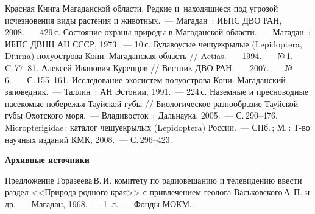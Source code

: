 \begin{thebibliography}{99}

\bibitem{} Красная Книга Магаданской области. Редкие и~находящиеся под угрозой исчезновения виды растения и животных.~--- Магадан~: ИБПС ДВО РАН, 2008.~--- 429\,с.
\bibitem{} Состояние охраны природы в Магаданской области.~--- Магадан~: ИБПС ДВНЦ АН СССР, 1973.~--- 10\,с.
\bibitem{} Булавоусые чешуекрылые (Lepidoptera, Diurna) полуострова Кони. Магаданская область // Actias.~--- 1994.~--- №\,1.~--- C.\,77--81.
\bibitem{} Алексей Иванович Куренцов // Вестник ДВО РАН.~--- 2007.~--- №\,6.~--- С.\,155--161.
\bibitem{} Исследование экосистем полуострова Кони. Магаданский заповедник.~--- Таллин~: АН Эстонии, 1991.~--- 224\,с.
\bibitem{} Наземные и пресноводные насекомые побережья Тауйской губы // Биологическое разнообразие Тауйской губы Охотского моря.~--- Владивосток~: Дальнаука, 2005.~--- С.\,290--476.
\bibitem{} Micropterigidae\,: каталог чешуекрылых (Lepidoptera) России.~--- СПб.\,; М.\,: Т-во научных изданий КМК, 2008.~--- С.\,296--423.

\textbf{Архивные источники}

\bibitem{}Предложение Горазеева\,В.\,И. комитету по радиовещанию и телевидению ввести раздел <<Природа родного края>> с привлечением геолога Васьковского\,А.\,П. и др.~--- Магадан, 1968.~--- 1~л.~--- Фонды МОКМ.
\end{thebibliography}
